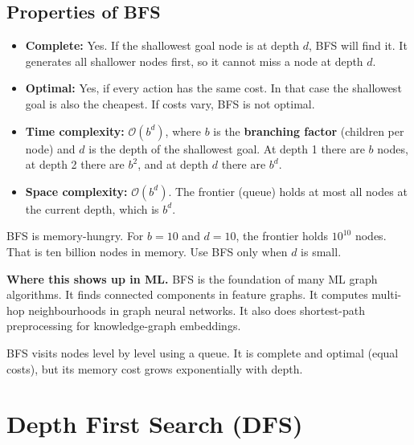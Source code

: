 \documentclass[a4paper,11pt]{article}
\newcommand{\vocab}[1]{\textbf{\color{navy}#1}}
\begin{document}
\subsection*{Properties of BFS}

\begin{itemize}
  \item \textbf{Complete:} Yes. If the shallowest goal node is at depth $d$,
    BFS will find it. It generates all shallower nodes first, so it cannot
    miss a node at depth $d$.
  \item \textbf{Optimal:} Yes, if every action has the same cost. In that
    case the shallowest goal is also the cheapest. If costs vary, BFS is
    not optimal.
  \item \textbf{Time complexity:} $\mathcal{O}(b^{d})$, where $b$ is the
    \vocab{branching factor} (children per node) and $d$ is the depth of the
    shallowest goal. At depth 1 there are $b$ nodes, at depth 2 there are
    $b^{2}$, and at depth $d$ there are $b^{d}$.
  \item \textbf{Space complexity:} $\mathcal{O}(b^{d})$. The frontier (queue)
    holds at most all nodes at the current depth, which is $b^{d}$.
\end{itemize}

\begin{watchout}
BFS is memory-hungry. For $b=10$ and $d=10$, the frontier holds $10^{10}$
nodes. That is ten billion nodes in memory. Use BFS only when $d$ is small.
\end{watchout}

\noindent\textbf{Where this shows up in ML.}
BFS is the foundation of many ML graph algorithms. It finds connected
components in feature graphs. It computes multi-hop neighbourhoods in graph
neural networks. It also does shortest-path preprocessing for
knowledge-graph embeddings.

\begin{keytake}
BFS visits nodes level by level using a queue. It is complete and optimal
(equal costs), but its memory cost grows exponentially with depth.
\end{keytake}

\section{Depth First Search (DFS)}
\end{document}
